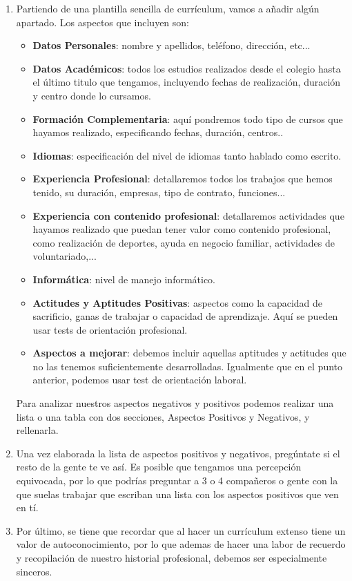 \begin{enumerate}
    \item Partiendo de una plantilla sencilla de currículum, vamos a añadir algún apartado. Los aspectos que incluyen son:
    \begin{itemize}
        \item \textbf{Datos Personales}: nombre y apellidos, teléfono, dirección, etc...
        \item \textbf{Datos Académicos}: todos los estudios realizados desde el colegio hasta el último titulo que tengamos, incluyendo fechas de realización, duración y centro donde lo cursamos.
        \item \textbf{Formación Complementaria}: aquí pondremos todo tipo de cursos que hayamos realizado, especificando fechas, duración, centros..
        \item \textbf{Idiomas}: especificación del nivel de idiomas tanto hablado como escrito.
        \item \textbf{Experiencia Profesional}: detallaremos todos los trabajos que hemos tenido, su duración, empresas, tipo de contrato, funciones...
        \item \textbf{Experiencia con contenido profesional}: detallaremos actividades que hayamos realizado que puedan tener valor como contenido profesional, como realización de deportes, ayuda en negocio familiar, actividades de voluntariado,...
        \item \textbf{Informática}: nivel de manejo informático.
        \item \textbf{Actitudes y Aptitudes Positivas}: aspectos como la capacidad de sacrificio, ganas de trabajar o capacidad de aprendizaje. Aquí se pueden usar tests de orientación profesional.
        \item \textbf{Aspectos a mejorar}: debemos incluir aquellas aptitudes y actitudes que no las tenemos suficientemente desarrolladas. Igualmente que en el punto anterior, podemos usar test de orientación laboral.
    \end{itemize}

    Para analizar nuestros aspectos negativos y positivos podemos realizar una lista o una tabla con dos secciones, Aspectos Positivos y Negativos, y rellenarla.

    \item Una vez elaborada la lista de aspectos positivos y negativos, pregúntate si el resto de la gente te ve así. Es posible que tengamos una percepción equivocada, por lo que podrías preguntar a 3 o 4 compañeros o gente con la que suelas trabajar que escriban una lista con los aspectos positivos que ven en tí.

    \item Por último, se tiene que recordar que al hacer un currículum extenso tiene un valor de autoconocimiento, por lo que ademas de hacer una labor de recuerdo y recopilación de nuestro historial profesional, debemos ser especialmente sinceros.
\end{enumerate}

